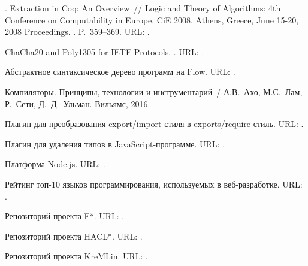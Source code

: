 \begin{thebibliography}{10}
. Extraction in Coq: An Overview~// Logic and Theory
  of Algorithms: 4th Conference on Computability in Europe, CiE 2008, Athens,
  Greece, June 15-20, 2008 Proceedings. \BibDash
{}. \BibDash
\newblock P.~359--369. \BibDash
\newblock URL: .

 ChaCha20 and Poly1305 for IETF Protocols. \BibDash
{}. \BibDash
\newblock URL: .

Абстрактное синтаксическое дерево
  программ на Flow. \BibDash
\newblock URL:
  .

Компиляторы. Принципы, технологии и
  инструментарий~/ А.В.~Ахо, М.С.~Лам, Р.~Сети,
  Д.~Д.~Ульман. \BibDash
\newblock Вильямс, 2016.

Плагин для преобразования export/import-стиля в
  exports/require-стиль. \BibDash
\newblock URL:
  .

Плагин для удаления типов в
  JavaScript-программе. \BibDash
\newblock URL:
  .

Платформа Node.js. \BibDash
\newblock URL: .

Рейтинг топ-10 языков программирования,
  используемых в веб-разработке. \BibDash
\newblock URL:
  .

Репозиторий проекта F*. \BibDash
\newblock URL: .

Репозиторий проекта HACL*. \BibDash
\newblock URL: .

Репозиторий проекта KreMLin. \BibDash
\newblock URL: .


\end{thebibliography}
